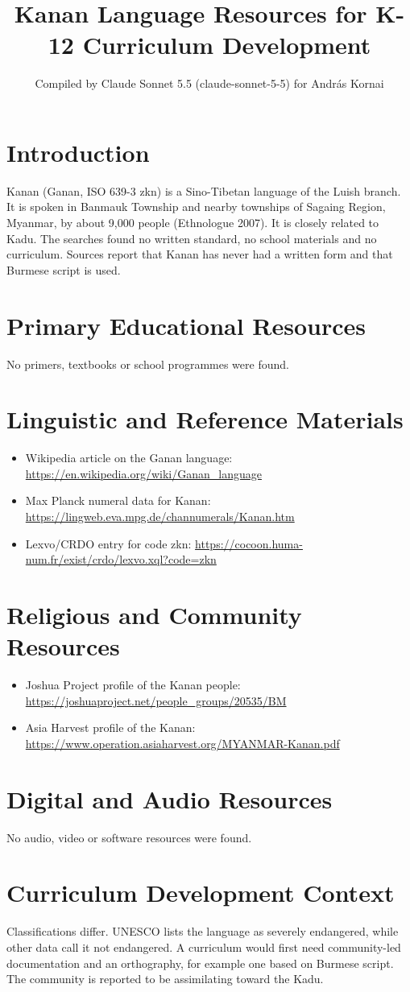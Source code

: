 \documentclass[12pt]{article}
\title{Kanan Language Resources for K-12 Curriculum Development}
\author{Compiled by Claude Sonnet 5.5 (claude-sonnet-5-5) for Andr\'as Kornai}
\date{}
\begin{document}
\maketitle

\section{Introduction}
Kanan (Ganan, ISO 639-3 zkn) is a Sino-Tibetan language of the Luish branch. It is spoken in Banmauk Township and nearby townships of Sagaing Region, Myanmar, by about 9,000 people (Ethnologue 2007). It is closely related to Kadu. The searches found no written standard, no school materials and no curriculum. Sources report that Kanan has never had a written form and that Burmese script is used.

\section{Primary Educational Resources}
No primers, textbooks or school programmes were found.

\section{Linguistic and Reference Materials}
\begin{itemize}
\item Wikipedia article on the Ganan language: \url{https://en.wikipedia.org/wiki/Ganan_language}
\item Max Planck numeral data for Kanan: \url{https://lingweb.eva.mpg.de/channumerals/Kanan.htm}
\item Lexvo/CRDO entry for code zkn: \url{https://cocoon.huma-num.fr/exist/crdo/lexvo.xql?code=zkn}
\end{itemize}

\section{Religious and Community Resources}
\begin{itemize}
\item Joshua Project profile of the Kanan people: \url{https://joshuaproject.net/people_groups/20535/BM}
\item Asia Harvest profile of the Kanan: \url{https://www.operation.asiaharvest.org/MYANMAR-Kanan.pdf}
\end{itemize}

\section{Digital and Audio Resources}
No audio, video or software resources were found.

\section{Curriculum Development Context}
Classifications differ. UNESCO lists the language as severely endangered, while other data call it not endangered. A curriculum would first need community-led documentation and an orthography, for example one based on Burmese script. The community is reported to be assimilating toward the Kadu.
\end{document}
